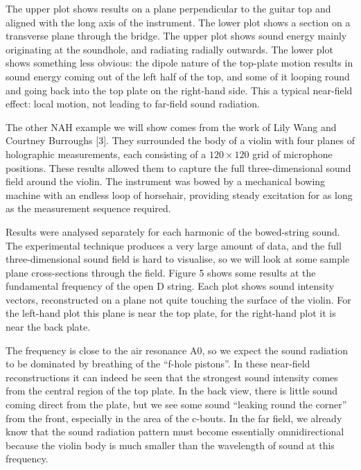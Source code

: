 
  The upper plot shows results on a plane perpendicular to the guitar top and 
  aligned with the long axis of the instrument. The lower plot shows a section 
  on a transverse plane through the bridge. The upper plot shows sound energy 
  mainly originating at the soundhole, and radiating radially outwards. The 
  lower plot shows something less obvious: the dipole nature of the top-plate 
  motion results in sound energy coming out of the left half of the top, and 
  some of it looping round and going back into the top plate on the right-hand 
  side. This a typical near-field effect: local motion, not leading to 
  far-field sound radiation. 

  The other NAH example we will show comes from the work of Lily Wang and 
  Courtney Burroughs [3]. They surrounded the body of a violin with four planes 
  of holographic measurements, each consisting of a $120 \times 120$ grid of 
  microphone positions. These results allowed them to capture the full 
  three-dimensional sound field around the violin. The instrument was bowed by 
  a mechanical bowing machine with an endless loop of horsehair, providing 
  steady excitation for as long as the measurement sequence required. 

  Results were analysed separately for each harmonic of the bowed-string sound. 
  The experimental technique produces a very large amount of data, and the full 
  three-dimensional sound field is hard to visualise, so we will look at some 
  sample plane cross-sections through the field. Figure 5 shows some results at 
  the fundamental frequency of the open D string. Each plot shows sound 
  intensity vectors, reconstructed on a plane not quite touching the surface of 
  the violin. For the left-hand plot this plane is near the top plate, for the 
  right-hand plot it is near the back plate. 



  The frequency is close to the air resonance A0, so we expect the sound 
  radiation to be dominated by breathing of the “f-hole pistons”. In these 
  near-field reconstructions it can indeed be seen that the strongest sound 
  intensity comes from the central region of the top plate. In the back view, 
  there is little sound coming direct from the plate, but we see some sound 
  “leaking round the corner” from the front, especially in the area of the 
  c-bouts. In the far field, we already know that the sound radiation pattern 
  must become essentially omnidirectional because the violin body is much 
  smaller than the wavelength of sound at this frequency. 

